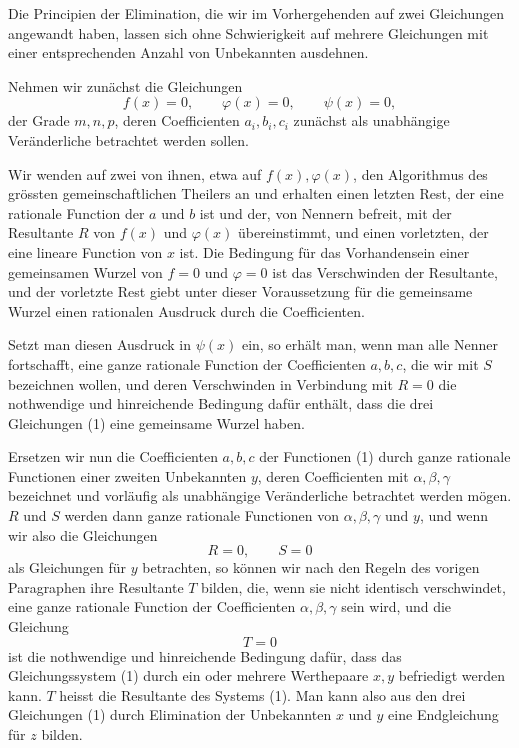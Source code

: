 \documentclass[11pt]{article}
\begin{document}
Die Principien der Elimination, die wir im Vorhergehenden auf zwei Gleichungen angewandt haben, lassen sich ohne Schwierigkeit auf mehrere Gleichungen mit einer entsprechenden Anzahl von Unbekannten ausdehnen.

Nehmen wir zunächst die Gleichungen
\begin{equation}
f(x)=0,\qquad \varphi(x)=0,\qquad \psi(x)=0,
\tag{1}
\end{equation}
der Grade $m,n,p$, deren Coefficienten $a_i,b_i,c_i$ zunächst als unabhängige Veränderliche betrachtet werden sollen.

Wir wenden auf zwei von ihnen, etwa auf $f(x),\varphi(x)$, den Algorithmus des grössten gemeinschaftlichen Theilers an und erhalten einen letzten Rest, der eine rationale Function der $a$ und $b$ ist und der, von Nennern befreit, mit der Resultante $R$ von $f(x)$ und $\varphi(x)$ übereinstimmt, und einen vorletzten, der eine lineare Function von $x$ ist. Die Bedingung für das Vorhandensein einer gemeinsamen Wurzel von $f=0$ und $\varphi=0$ ist das Verschwinden der Resultante, und der vorletzte Rest giebt unter dieser Voraussetzung für die gemeinsame Wurzel einen rationalen Ausdruck durch die Coefficienten.

Setzt man diesen Ausdruck in $\psi(x)$ ein, so erhält man, wenn man alle Nenner fortschafft, eine ganze rationale Function der Coefficienten $a,b,c$, die wir mit $S$ bezeichnen wollen, und deren Verschwinden in Verbindung mit $R=0$ die nothwendige und hinreichende Bedingung dafür enthält, dass die drei Gleichungen (1) eine gemeinsame Wurzel haben.

Ersetzen wir nun die Coefficienten $a,b,c$ der Functionen (1) durch ganze rationale Functionen einer zweiten Unbekannten $y$, deren Coefficienten mit $\alpha,\beta,\gamma$ bezeichnet und vorläufig als unabhängige Veränderliche betrachtet werden mögen. $R$ und $S$ werden dann ganze rationale Functionen von $\alpha,\beta,\gamma$ und $y$, und wenn wir also die Gleichungen
\begin{equation}
R=0,\qquad S=0
\tag{2}
\end{equation}
als Gleichungen für $y$ betrachten, so können wir nach den Regeln des vorigen Paragraphen ihre Resultante $T$ bilden, die, wenn sie nicht identisch verschwindet, eine ganze rationale Function der Coefficienten $\alpha,\beta,\gamma$ sein wird, und die Gleichung
\begin{equation}
T=0
\tag{3}
\end{equation}
ist die nothwendige und hinreichende Bedingung dafür, dass das Gleichungssystem (1) durch ein oder mehrere Werthepaare $x,y$ befriedigt werden kann. $T$ heisst die Resultante des Systems (1). Man kann also aus den drei Gleichungen (1) durch Elimination der Unbekannten $x$ und $y$ eine Endgleichung für $z$ bilden.
\end{document}
